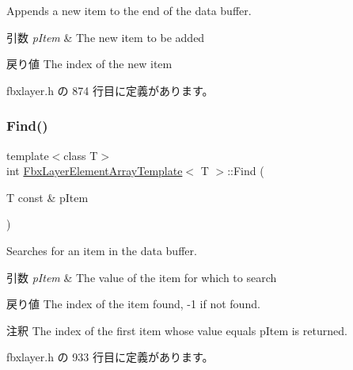 Appends a new item to the end of the data buffer. 
\begin{DoxyParams}{引数}
{\em p\+Item} & The new item to be added \\
\hline
\end{DoxyParams}
\begin{DoxyReturn}{戻り値}
The index of the new item 
\end{DoxyReturn}


 fbxlayer.\+h の 874 行目に定義があります。

\mbox{\label{class_fbx_layer_element_array_template_a60e464ae7d193fa397d2099c760482d6}} 
\subsubsection{\texorpdfstring{Find()}{Find()}}
{\footnotesize\ttfamily template$<$class T$>$ \\
int \hyperlink{class_fbx_layer_element_array_template}{Fbx\+Layer\+Element\+Array\+Template}$<$ T $>$\+::Find (\begin{DoxyParamCaption}\item[{T const \&}]{p\+Item }\end{DoxyParamCaption})\hspace{0.3cm}{\ttfamily [inline]}}

Searches for an item in the data buffer. 
\begin{DoxyParams}{引数}
{\em p\+Item} & The value of the item for which to search \\
\hline
\end{DoxyParams}
\begin{DoxyReturn}{戻り値}
The index of the item found, -\/1 if not found. 
\end{DoxyReturn}
\begin{DoxyRemark}{注釈}
The index of the first item whose value equals p\+Item is returned. 
\end{DoxyRemark}


 fbxlayer.\+h の 933 行目に定義があります。

\mbox{\label{class_fbx_layer_element_array_template_a76bad491c68ab608c7f07daf7e659bfe}} 
